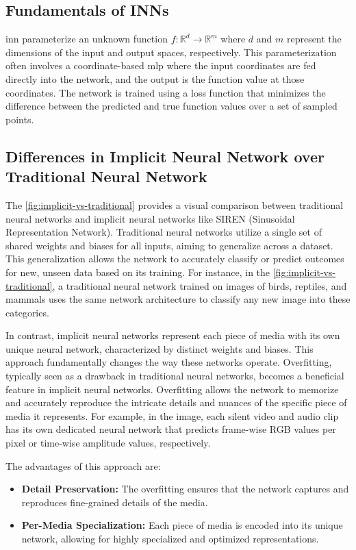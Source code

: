     \subsection{Fundamentals of INNs}
    \gls{inn} parameterize an unknown function \( f: \mathbb{R}^d \rightarrow \mathbb{R}^m \) where \( d \) and \( m \) represent the dimensions of the input and output spaces, respectively. This parameterization often involves a coordinate-based \gls{mlp} where the input coordinates are fed directly into the network, and the output is the function value at those coordinates. The network is trained using a loss function that minimizes the difference between the predicted and true function values over a set of sampled points.

    \subsection{Differences in Implicit Neural Network over Traditional Neural Network}

    The \autoref{fig:implicit-vs-traditional} provides a visual comparison between traditional neural networks and implicit neural networks like SIREN (Sinusoidal Representation Network). Traditional neural networks utilize a single set of shared weights and biases for all inputs, aiming to generalize across a dataset. This generalization allows the network to accurately classify or predict outcomes for new, unseen data based on its training. For instance, in the \autoref{fig:implicit-vs-traditional}, a traditional neural network trained on images of birds, reptiles, and mammals uses the same network architecture to classify any new image into these categories.

    In contrast, implicit neural networks represent each piece of media with its own unique neural network, characterized by distinct weights and biases. This approach fundamentally changes the way these networks operate. Overfitting, typically seen as a drawback in traditional neural networks, becomes a beneficial feature in implicit neural networks. Overfitting allows the network to memorize and accurately reproduce the intricate details and nuances of the specific piece of media it represents. For example, in the image, each silent video and audio clip has its own dedicated neural network that predicts frame-wise RGB values per pixel or time-wise amplitude values, respectively.

    The advantages of this approach are:

    \begin{itemize}
        \item \textbf{Detail Preservation:} The overfitting ensures that the network captures and reproduces fine-grained details of the media.
        \item \textbf{Per-Media Specialization:} Each piece of media is encoded into its unique network, allowing for highly specialized and optimized representations.
    \end{itemize}

